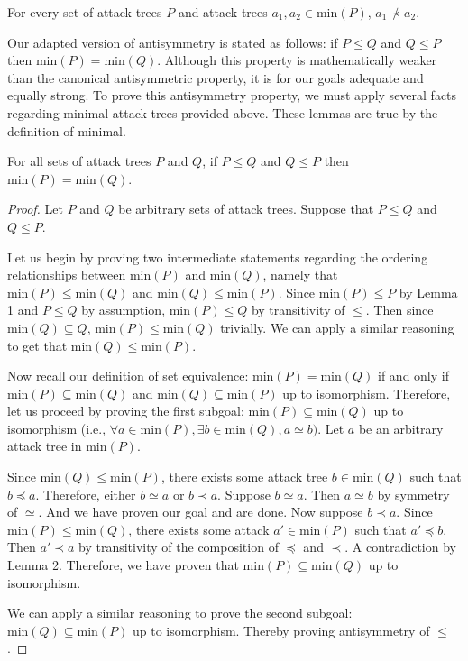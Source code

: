 \documentclass[runningheads]{llncs}
\theoremstyle{definition}
\begin{document}
\begin{lemma}
  For every set of attack trees $P$ and attack trees $a_1, a_2 \in
  \text{min}(P)$, $a_1 \nprec a_2$. 
\end{lemma}

Our adapted version of antisymmetry is stated as follows: if $P \le Q$
and $Q \le P$ then $\text{min}(P) = \text{min}(Q)$. Although this
property is mathematically weaker than the canonical antisymmetric
property, it is for our goals adequate and equally strong. To prove
this antisymmetry property, we must apply several facts regarding
minimal attack trees provided above. These lemmas are true by the
definition of minimal.



\begin{theorem}
  For all sets of attack trees $P$ and $Q$, if $P \le Q$ and $Q \le P$
  then $\text{min}(P) = \text{min}(Q)$. 
\end{theorem}
\begin{proof}
  Let $P$ and $Q$ be arbitrary sets of attack trees. Suppose that $P
  \le Q$ and $Q \le P$.  
  
  Let us begin by proving two intermediate statements regarding the
  ordering relationships between $\text{min}(P)$ and $\text{min}(Q)$,
  namely that $\text{min}(P) \leq \text{min}(Q)$ and $\text{min}(Q)
  \leq \text{min}(P)$. Since $\text{min}(P) \leq P$ by Lemma 1 and $P
  \leq Q$ by assumption, $\text{min}(P) \leq Q$ by transitivity of
  $\leq$. Then since $\text{min}(Q) \subseteq Q$, $\text{min}(P) \leq
  \text{min}(Q)$ trivially. We can apply a similar reasoning to get
  that $\text{min}(Q) \leq \text{min}(P)$. 

  Now recall our definition of set equivalence: $\text{min}(P) =
  \text{min}(Q)$ if and only if $\text{min}(P) \subseteq
  \text{min}(Q)$ and $\text{min}(Q) \subseteq \text{min}(P)$ up to
  isomorphism. Therefore, let us proceed by proving the first subgoal:
  $\text{min}(P) \subseteq \text{min}(Q)$ up to isomorphism (i.e.,
  $\forall a \in \text{min}(P), \exists b \in \text{min}(Q), a \simeq
  b)$.  Let $a$ be an arbitrary attack tree in $\text{min}(P)$.  

  Since $\text{min}(Q) \leq \text{min}(P)$, there exists some attack
  tree $b \in \text{min}(Q)$ such that $b \preceq a$. Therefore,
  either $b \simeq a$ or $b \prec a$. Suppose $b \simeq a$. Then $a
  \simeq b$ by symmetry of $\simeq$. And we have proven our goal and
  are done. Now suppose $b \prec a$. Since $\text{min}(P) \leq
  \text{min}(Q)$, there exists some attack $a' \in \text{min}(P)$ such
  that $a' \preceq b$. Then $a' \prec a$ by transitivity of the
  composition of $\preceq$ and $\prec$. A contradiction by Lemma
  2. Therefore, we have proven that $\text{min}(P) \subseteq
  \text{min}(Q)$ up to isomorphism. 
  
  We can apply a similar reasoning to prove the second subgoal:
  $\text{min}(Q) \subseteq \text{min}(P)$ up to isomorphism. Thereby
  proving antisymmetry of $\leq$. 
\end{proof}
\end{document}

